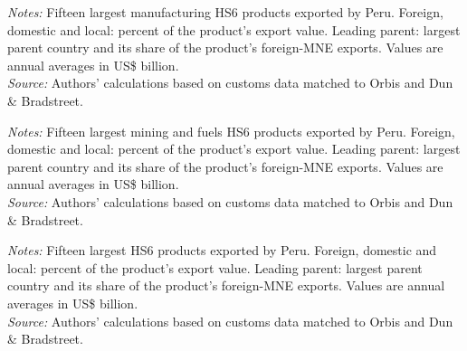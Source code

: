 \documentclass[11pt,a4paper]{article}
\begin{document}
\begin{table}[H]\centering\footnotesize%
  \caption{Peru, Manufacturing: Fifteen Largest Export Products}%
  \label{tab:c_hs6_PER_manufacturing}%
  \par\vspace{3pt}%
  \begin{minipage}{0.95\textwidth}\footnotesize %
  \textit{Notes:} Fifteen largest manufacturing HS6 products exported by Peru. Foreign, domestic and local: percent of the product's export value. Leading parent: largest parent country and its share of the product's foreign-MNE exports. Values are annual averages in US\$ billion.\\[3pt]%
  \textit{Source:} Authors' calculations based on customs data matched to Orbis and Dun \& Bradstreet.%
  \end{minipage}%
  \end{table}
\begin{table}[H]\centering\footnotesize%
  \caption{Peru, Mining and Fuels: Fifteen Largest Export Products}%
  \label{tab:c_hs6_PER_mining}%
  \par\vspace{3pt}%
  \begin{minipage}{0.95\textwidth}\footnotesize %
  \textit{Notes:} Fifteen largest mining and fuels HS6 products exported by Peru. Foreign, domestic and local: percent of the product's export value. Leading parent: largest parent country and its share of the product's foreign-MNE exports. Values are annual averages in US\$ billion.\\[3pt]%
  \textit{Source:} Authors' calculations based on customs data matched to Orbis and Dun \& Bradstreet.%
  \end{minipage}%
  \end{table}
\begin{table}[H]\centering\footnotesize%
  \caption{Peru, Other Goods: Fifteen Largest Export Products}%
  \label{tab:c_hs6_PER_rest}%
  \par\vspace{3pt}%
  \begin{minipage}{0.95\textwidth}\footnotesize %
  \textit{Notes:} Fifteen largest HS6 products exported by Peru. Foreign, domestic and local: percent of the product's export value. Leading parent: largest parent country and its share of the product's foreign-MNE exports. Values are annual averages in US\$ billion.\\[3pt]%
  \textit{Source:} Authors' calculations based on customs data matched to Orbis and Dun \& Bradstreet.%
  \end{minipage}%
  \end{table}
\end{document}
